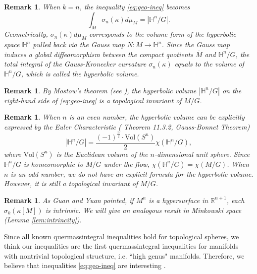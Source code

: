 \documentclass[10pt,a4paper]{amsart}
\newtheorem{remark}[theorem]{Remark}
\newcommand{\abs}[1]{\left\lvert{#1}\right\rvert}
\renewcommand{\H}{{\mathbb{H}}}
\numberwithin{equation}{section}
\begin{document}
\begin{remark}
When $k=n$, the inequality \eqref{eq:geo-ineq}  becomes
\begin{equation}
\int_{\overline{M}} \sigma_n(\kappa) d\mu_M = |\mathbb{H}^n/G|.
\end{equation}
Geometrically, $\sigma_n(\kappa)d\mu_M$ corresponds to the volume form of the hyperbolic space $\mathbb{H}^n$ pulled back via the Gauss map $N: M \to \mathbb{H}^n$. Since the Gauss map induces a global diffeomorphism between the compact quotients $\overline{M}$ and $\mathbb{H}^n/G$, the total integral of the Gauss-Kronecker curvature $\sigma_n(\kappa)$ equals to the volume of $\mathbb{H}^n/G$, which is called the {\em hyperbolic volume}.
\end{remark}

\begin{remark}
    By Mostow's theorem (see \cite{Benedetti1992}), the hyperbolic volume \(\abs{\H^n / G}\) on the right-hand side of \eqref{eq:geo-ineq} is a topological invariant of \( M/G \).
\end{remark}
\begin{remark}
    When \(n\) is an even number, the hyperbolic volume can be explicitly expressed by the Euler Characteristic (\cite{Ratcliffe2019} Theorem 11.3.2, Gauss-Bonnet Theorem)
    \[ |\H^n / G| = \frac{(-1)^{\frac{n}{2}} \cdot \text{Vol}(S^{n})}{2} \chi(\H^n / G), \]
    where \(\text{Vol}(S^{n})\) is the Euclidean volume of the $n$-dimensional unit sphere. Since \(\H^n / G\) is homeomorphic to \(M / G\) under the flow, \(\chi(\H^n / G) = \chi(M / G)\).
When \(n\) is an odd number, we do not have an explicit formula for the hyperbolic volume. However, it is still a topological invariant of \(M / G\). 
\end{remark}

\begin{remark}\label{GuanYuan}
    As Guan and Yuan \cite{guan2025-intrinsicality} pointed, if \(M^n\) is a hypersurface in  \(\mathbb{R}^{n+1}\), each \(\sigma_k(\kappa[M])\) is intrinsic. We will give an analogous result in Minkowski space (Lemma \ref{lem:intrincity}). 
\end{remark}

Since all known quermassintegral inequalities hold for topological spheres, we think our inequalities are the first quermassintegral inequalities for manifolds with nontrivial topological structure, i.e. ``high genus" manifolds.  Therefore, we believe that inequalities \eqref{eq:geo-ineq}  are  interesting .          
\end{document}
